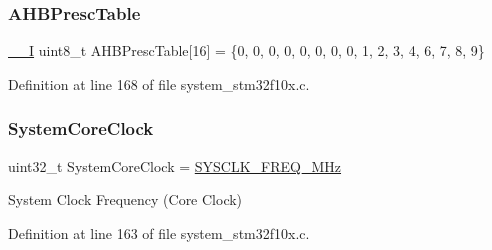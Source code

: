 \subsubsection{\texorpdfstring{A\+H\+B\+Presc\+Table}{AHBPrescTable}}
{\footnotesize\ttfamily \hyperlink{core__sc300_8h_af63697ed9952cc71e1225efe205f6cd3}{\+\_\+\+\_\+I} uint8\+\_\+t A\+H\+B\+Presc\+Table\mbox{[}16\mbox{]} = \{0, 0, 0, 0, 0, 0, 0, 0, 1, 2, 3, 4, 6, 7, 8, 9\}}



Definition at line 168 of file system\+\_\+stm32f10x.\+c.

\mbox{\label{group___s_t_m32_f10x___system___private___variables_gaa3cd3e43291e81e795d642b79b6088e6}} 
\subsubsection{\texorpdfstring{System\+Core\+Clock}{SystemCoreClock}}
{\footnotesize\ttfamily uint32\+\_\+t System\+Core\+Clock = \hyperlink{group___s_t_m32_f10x___system___private___defines_ga69649cc38f34627cfb48b51062ebd390}{S\+Y\+S\+C\+L\+K\+\_\+\+F\+R\+E\+Q\+\_\+M\+Hz}}

System Clock Frequency (Core Clock) 

Definition at line 163 of file system\+\_\+stm32f10x.\+c.

